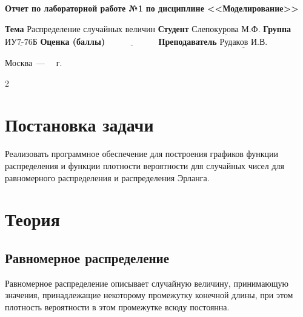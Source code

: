 \documentclass[12pt]{report}
\begin{document}
\begin{titlepage}
		\begin{center}
			\noindent\begin{minipage}{1.1\textwidth}\centering
				\Large\textbf{Отчет по лабораторной работе №1}\newline
				\textbf{по дисциплине <<Моделирование>>}\newline\newline
			\end{minipage}
		\end{center}
		
		\noindent\textbf{Тема} $\underline{\text{Распределение случайных величин}}$\newline\newline
		\noindent\textbf{Студент} $\underline{\text{Слепокурова М.Ф.}}$\newline\newline
		\noindent\textbf{Группа} $\underline{\text{ИУ7-76Б}}$\newline\newline
		\noindent\textbf{Оценка (баллы)} $\underline{\text{~~~~~~~~~~~~~~~~~}}$\newline\newline
		\noindent\textbf{Преподаватель} $\underline{\text{Рудаков И.В.}}$\newline\newline\newline
		
		\begin{center}
			\vfill
			Москва~---~\the\year
			~г.
		\end{center}
	\end{titlepage}

\setcounter{page} {2}





\section*{Постановка задачи}
Реализовать программное обеспечение для построения графиков функции распределения и функции плотности вероятности для случайных чисел для равномерного распределения и распределения Эрланга.

\section*{Теория}
\subsection*{Равномерное распределение}
Равномерное распределение описывает случайную величину, принимающую значения, принадлежащие некоторому промежутку конечной длины, при этом плотность вероятности в этом промежутке всюду постоянна.
\newline
\end{document}
